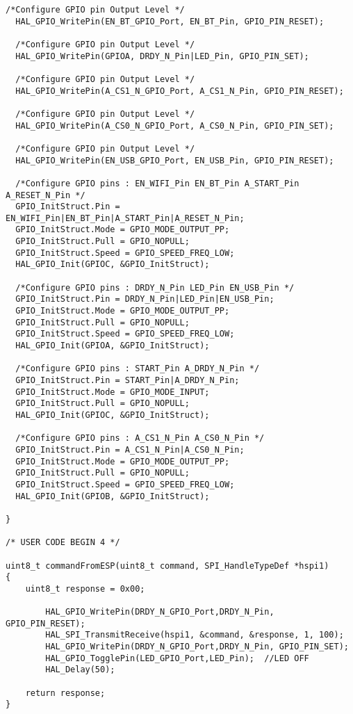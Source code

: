 \begin{lstlisting}[label=algoritmo:STM32F4:main.c,style = STM-code,frame=single,caption=STM32F4:main.c]
  /*Configure GPIO pin Output Level */
  HAL_GPIO_WritePin(EN_BT_GPIO_Port, EN_BT_Pin, GPIO_PIN_RESET);

  /*Configure GPIO pin Output Level */
  HAL_GPIO_WritePin(GPIOA, DRDY_N_Pin|LED_Pin, GPIO_PIN_SET);

  /*Configure GPIO pin Output Level */
  HAL_GPIO_WritePin(A_CS1_N_GPIO_Port, A_CS1_N_Pin, GPIO_PIN_RESET);

  /*Configure GPIO pin Output Level */
  HAL_GPIO_WritePin(A_CS0_N_GPIO_Port, A_CS0_N_Pin, GPIO_PIN_SET);

  /*Configure GPIO pin Output Level */
  HAL_GPIO_WritePin(EN_USB_GPIO_Port, EN_USB_Pin, GPIO_PIN_RESET);

  /*Configure GPIO pins : EN_WIFI_Pin EN_BT_Pin A_START_Pin A_RESET_N_Pin */
  GPIO_InitStruct.Pin = EN_WIFI_Pin|EN_BT_Pin|A_START_Pin|A_RESET_N_Pin;
  GPIO_InitStruct.Mode = GPIO_MODE_OUTPUT_PP;
  GPIO_InitStruct.Pull = GPIO_NOPULL;
  GPIO_InitStruct.Speed = GPIO_SPEED_FREQ_LOW;
  HAL_GPIO_Init(GPIOC, &GPIO_InitStruct);

  /*Configure GPIO pins : DRDY_N_Pin LED_Pin EN_USB_Pin */
  GPIO_InitStruct.Pin = DRDY_N_Pin|LED_Pin|EN_USB_Pin;
  GPIO_InitStruct.Mode = GPIO_MODE_OUTPUT_PP;
  GPIO_InitStruct.Pull = GPIO_NOPULL;
  GPIO_InitStruct.Speed = GPIO_SPEED_FREQ_LOW;
  HAL_GPIO_Init(GPIOA, &GPIO_InitStruct);

  /*Configure GPIO pins : START_Pin A_DRDY_N_Pin */
  GPIO_InitStruct.Pin = START_Pin|A_DRDY_N_Pin;
  GPIO_InitStruct.Mode = GPIO_MODE_INPUT;
  GPIO_InitStruct.Pull = GPIO_NOPULL;
  HAL_GPIO_Init(GPIOC, &GPIO_InitStruct);

  /*Configure GPIO pins : A_CS1_N_Pin A_CS0_N_Pin */
  GPIO_InitStruct.Pin = A_CS1_N_Pin|A_CS0_N_Pin;
  GPIO_InitStruct.Mode = GPIO_MODE_OUTPUT_PP;
  GPIO_InitStruct.Pull = GPIO_NOPULL;
  GPIO_InitStruct.Speed = GPIO_SPEED_FREQ_LOW;
  HAL_GPIO_Init(GPIOB, &GPIO_InitStruct);

}

/* USER CODE BEGIN 4 */

uint8_t commandFromESP(uint8_t command, SPI_HandleTypeDef *hspi1)
{
	uint8_t response = 0x00;	

		HAL_GPIO_WritePin(DRDY_N_GPIO_Port,DRDY_N_Pin, GPIO_PIN_RESET);
		HAL_SPI_TransmitReceive(hspi1, &command, &response, 1, 100);
		HAL_GPIO_WritePin(DRDY_N_GPIO_Port,DRDY_N_Pin, GPIO_PIN_SET);
		HAL_GPIO_TogglePin(LED_GPIO_Port,LED_Pin); 	//LED OFF
		HAL_Delay(50);
	
	return response;
}


\end{lstlisting}
